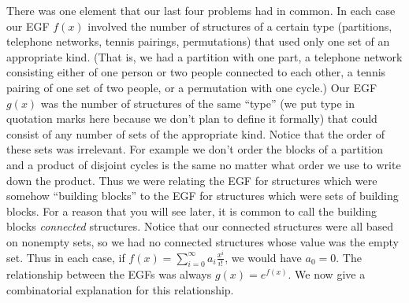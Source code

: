 \documentclass[10pt,]{book}
\theoremstyle{plain}
\theoremstyle{definition}
\theoremstyle{definition}
\numberwithin{equation}{chapter}
\begin{document}
There was one element that our last four problems had in common. In each case our EGF \(f(x)\) involved the number of structures of a certain type (partitions, telephone networks, tennis pairings, permutations) that used only one set of an appropriate kind. (That is, we had a partition with one part, a telephone network consisting either of one person or two people connected to each other, a tennis pairing of one set of two people, or a permutation with one cycle.) Our EGF \(g(x)\) was the number of structures of the same ``type'' (we put type in quotation marks here because we don't plan to define it formally) that could consist of any number of sets of the appropriate kind. Notice that the order of these sets was irrelevant. For example we don't order the blocks of a partition and a product of disjoint cycles is the same no matter what order we use to write down the product. Thus we were relating the EGF for structures which were somehow ``building blocks'' to the EGF for structures which were sets of building blocks. For a reason that you will see later, it is common to call the building blocks \emph{connected} structures. Notice that our connected structures were all based on nonempty sets, so we had no connected structures whose value was the empty set. Thus in each case, if \(f(x) = \sum_{i=0}^\infty a_i\frac{x^i}{i!}\), we would have \(a_0=0\). The relationship between the EGFs was always \(g(x) = e^{f(x)}\). We now give a combinatorial explanation for this relationship.%
\end{document}
